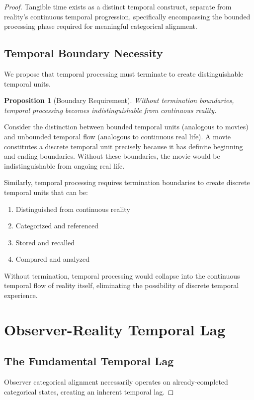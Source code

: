 \documentclass[12pt,a4paper]{article}
\newtheorem{proposition}{Proposition}
\begin{document}
\begin{proof}
Tangible time exists as a distinct temporal construct, separate from reality's continuous temporal progression, specifically encompassing the bounded processing phase required for meaningful categorical alignment.

\subsection{Temporal Boundary Necessity}

We propose that temporal processing must terminate to create distinguishable temporal units.

\begin{proposition}[Boundary Requirement]
Without termination boundaries, temporal processing becomes indistinguishable from continuous reality.
\end{proposition}

Consider the distinction between bounded temporal units (analogous to movies) and unbounded temporal flow (analogous to continuous real life). A movie constitutes a discrete temporal unit precisely because it has definite beginning and ending boundaries. Without these boundaries, the movie would be indistinguishable from ongoing real life.

Similarly, temporal processing requires termination boundaries to create discrete temporal units that can be:
\begin{enumerate}
\item Distinguished from continuous reality
\item Categorized and referenced
\item Stored and recalled
\item Compared and analyzed
\end{enumerate}

Without termination, temporal processing would collapse into the continuous temporal flow of reality itself, eliminating the possibility of discrete temporal experience.

\section{Observer-Reality Temporal Lag}

\subsection{The Fundamental Temporal Lag}

Observer categorical alignment necessarily operates on already-completed categorical states, creating an inherent temporal lag.


\end{proof}
\end{document}
